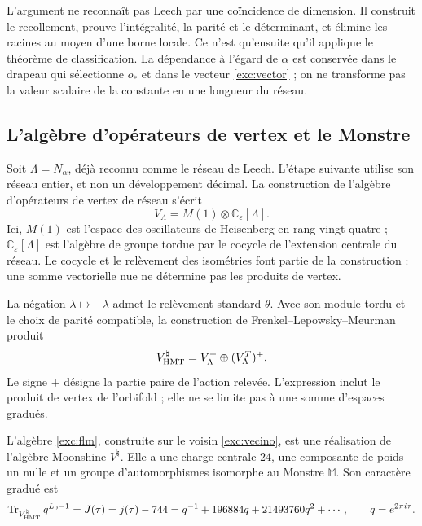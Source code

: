L'argument ne reconnaît pas Leech par une coïncidence de dimension.
Il construit le recollement, prouve l'intégralité, la parité et le déterminant, et
élimine les racines au moyen d'une borne locale. Ce n'est qu'ensuite qu'il applique le
théorème de classification. La dépendance à l'égard de $\alpha$ est conservée dans
le drapeau qui sélectionne $o_*$ et dans le vecteur \eqref{exc:vector} ;
on ne transforme pas la valeur scalaire de la constante en une longueur du
réseau.

\subsection{L'algèbre d'opérateurs de vertex et le Monstre}
\label{exc:voa}

Soit $\Lambda=N_\alpha$, déjà reconnu comme le réseau de Leech. L'étape suivante utilise son réseau entier, et non un développement décimal. La construction de l'algèbre d'opérateurs de vertex de réseau s'écrit
\[
 V_\Lambda=M(1)\otimes\mathbb C_\varepsilon[\Lambda].
\]
Ici, $M(1)$ est l'espace des oscillateurs de Heisenberg en rang vingt-quatre ; $\mathbb C_\varepsilon[\Lambda]$ est l'algèbre de groupe tordue par le cocycle de l'extension centrale du réseau. Le cocycle et le relèvement des isométries font partie de la construction : une somme vectorielle nue ne détermine pas les produits de vertex.

La négation $\lambda\mapsto-\lambda$ admet le relèvement standard
$\theta$. Avec son module tordu et le choix de parité compatible,
la construction de Frenkel--Lepowsky--Meurman produit
\begin{equation}
 V^\natural_{\rm HMT}
   =V_\Lambda^+\oplus(V_\Lambda^T)^+.
 \label{exc:flm}
\end{equation}
Le signe $+$ désigne la partie paire de l'action relevée. L'expression
inclut le produit de vertex de l'orbifold ; elle ne se limite pas à une somme
d'espaces gradués.

\begin{theorem}
\label{exc:moonshine}
L'algèbre \eqref{exc:flm}, construite sur le voisin
\eqref{exc:vecino}, est une réalisation de l'algèbre Moonshine
$V^\natural$. Elle a une charge centrale $24$, une composante de poids un nulle
et un groupe d'automorphismes isomorphe au Monstre $\mathbb M$. Son caractère
gradué est
\begin{equation}
 \operatorname{Tr}_{V^\natural_{\rm HMT}}q^{L_0-1}
   =J(\tau)=j(\tau)-744
   =q^{-1}+196884q+21493760q^2+\cdots,
 \qquad q=e^{2\pi i\tau}.
 \label{exc:j}
\end{equation}
\end{theorem}

